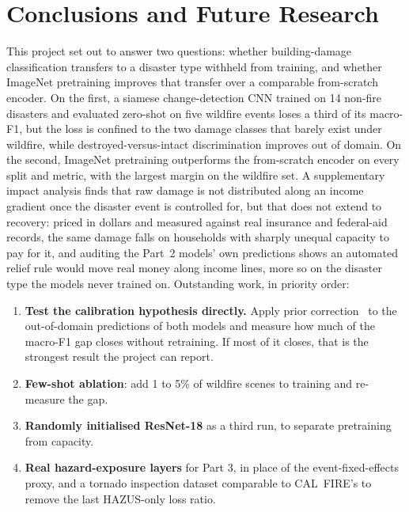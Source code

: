 \documentclass[10pt,twocolumn]{article}
\begin{document}
\section{Conclusions and Future Research}

This project set out to answer two questions: whether building-damage classification transfers to a
disaster type withheld from training, and whether ImageNet pretraining improves that transfer over a
comparable from-scratch encoder. On the first, a siamese change-detection CNN trained on 14 non-fire
disasters and evaluated zero-shot on five wildfire events loses a third of its macro-F1, but the loss
is confined to the two damage classes that barely exist under wildfire, while
destroyed-versus-intact discrimination improves out of domain. On the second, ImageNet pretraining
outperforms the from-scratch encoder on every split and metric, with the largest margin on the
wildfire set. A supplementary impact analysis finds that raw damage is not distributed along an
income gradient once the disaster event is controlled for, but that does not extend to recovery:
priced in dollars and measured against real insurance and federal-aid records, the same damage falls
on households with sharply unequal capacity to pay for it, and auditing the Part~2 models' own
predictions shows an automated relief rule would move real money along income lines, more so on the
disaster type the models never trained on. Outstanding work, in priority order:

\begin{enumerate}[leftmargin=*,itemsep=2pt,topsep=3pt]
\item \textbf{Test the calibration hypothesis directly.} Apply prior correction~\cite{saerens} to the
out-of-domain predictions of both models and measure how much of the macro-F1 gap closes without
retraining. If most of it closes, that is the strongest result the project can report.
\item \textbf{Few-shot ablation}: add 1 to 5\% of wildfire scenes to training and re-measure the gap.
\item \textbf{Randomly initialised ResNet-18} as a third run, to separate pretraining from capacity.
\item \textbf{Real hazard-exposure layers} for Part 3, in place of the event-fixed-effects proxy, and
a tornado inspection dataset comparable to CAL~FIRE's to remove the last HAZUS-only loss ratio.
\end{enumerate}
\end{document}
